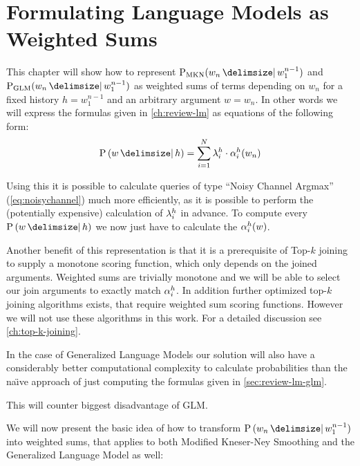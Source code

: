 \chapter{Formulating Language Models as Weighted Sums}
\label{ch:weightedsum}


This chapter will show how to represent  $\ProbMKN{w_n}{w_1^{n-1}}$ and
$\ProbGLM{w_n}{w_1^{n-1}}$ as weighted sums of terms depending on $w_n$ for a
fixed history $h = w_1^{n-1}$ and an  arbitrary argument $w = w_n$.
In other words we will express the formulas given in \cref{ch:review-lm} as
equations of the following form:
\begin{equation}
  \Prob{w}{h} = \sum_{i = 1}^{N} \SumWeight_i^h \cdot \SumArg_i^h(w_n)
\end{equation}

Using this it is possible to calculate queries of type ``Noisy Channel Argmax''
(\cref{eq:noisychannel}) much more efficiently, as it is possible to perform the
(potentially expensive) calculation of $\lambda_i^h$ in advance.
To compute every $\Prob{w}{h}$ we now just have to calculate the
$\alpha_i^h(w)$.

Another benefit of this representation is that it is a prerequisite of Top-$k$
joining to supply a monotone scoring function, which only depends on the
joined arguments.
Weighted sums are trivially monotone  and we will be able to
select our join arguments to exactly match $\alpha_i^h$.
In addition further optimized top-$k$ joining algorithms exists, that require
weighted sum scoring functions.
However we will not use these algorithms in this work.
For a detailed discussion see \cref{ch:top-k-joining}.

In the case of Generalized Language Models our solution will also have a
considerably better computational complexity to calculate probabilities than the
na{\"\i}ve approach of just computing the formulas given in
\cref{sec:review-lm-glm}.
\begin{draft}
This will counter biggest disadvantage of GLM.
\end{draft}

We will now present the basic idea of how to transform $\Prob{w_n}{w_1^{n-1}}$
into weighted sums, that applies to both Modified Kneser-Ney Smoothing and
the Generalized Language Model as well:

